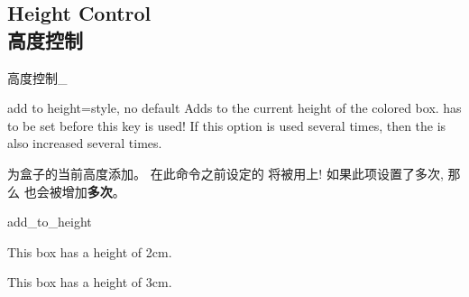 \setcounter{section}{4}
\setcounter{subsection}{9}
\setcounter{subsubsection}{0}
\subsection{Height Control\\高度控制}\label{sec:heightcontrol}

% 
% 
% 
% 
% 
% 





高度控制_









\begin{docTcbKey}[][doc new=2014-11-07]{add to height}{=}{style, no default}
Adds  to the current height of the colored box.
 has to be set before this key is used!
If this option is used several times, then the  is
also increased several times.

为盒子的当前高度添加。%
在此命令之前设定的  将被用上!%
如果此项设置了多次, 那么  也会被增加{\bf 多次}。
\begin{exdispExample}{add_to_height}

\begin{tcolorbox}
This box has a height of 2cm.
\end{tcolorbox}
\begin{tcolorbox}[add to height=1cm]
This box has a height of 3cm.
\end{tcolorbox}
\end{exdispExample}
\end{docTcbKey}


